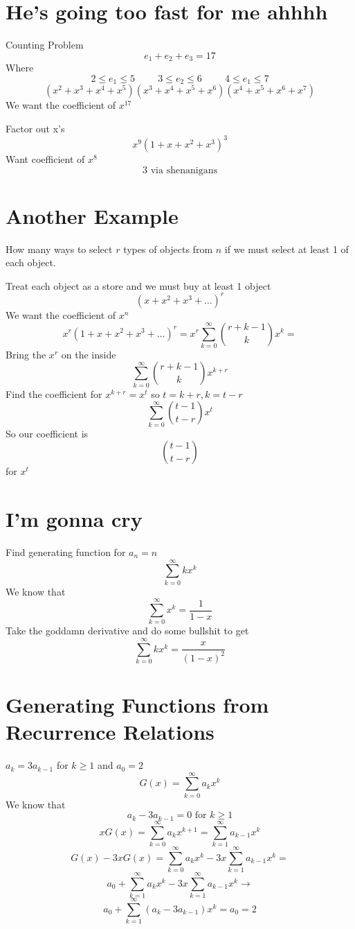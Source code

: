 \documentclass{report}
\begin{document}
\section{He's going too fast for me ahhhh}
Counting Problem
\[
e_1 + e_2 + e_3 = 17
\]
Where
\[
2 \leq e_1 \leq 5
\hspace{1cm}
3 \leq e_2 \leq 6
\hspace{1cm}
4 \leq e_1 \leq 7
\]
\[
(x^2 + x^3 + x^4 + x^5)
(x^3 + x^4 + x^5 + x^6)
(x^4 + x^5 + x^6 + x^7)
\]
We want the coefficient of $x^{17}$

Factor out x's
\[
x^9 (1 + x + x^2 + x^3)^3
\]
Want coefficient of $x^8$
\[
3 \textrm{ via shenanigans}
\]

\section{Another Example}
How many ways to select $r$ types of objects from $n$ if we must select at least 1 of each object.

Treat each object as a store and we must buy at least 1 object
\[
(x+x^2+x^3 + \ldots )^r
\]
We want the coefficient of $x^n$
\[
x^r (1 + x+x^2+x^3 + \ldots )^r
=
x^r \sum^\infty_{k=0} {r+k-1 \choose k} x^k
=
\]
Bring the $x^r$ on the inside
\[
 \sum^\infty_{k=0} {r+k-1 \choose k} x^{k+r}
\]
Find the coefficient for $x^{k+r} = x^t$ so $t = k+r, k = t -r$
\[
 \sum^\infty_{k=0} {t-1 \choose t-r} x^{t}
\]
So our coefficient is 
\[
{t-1 \choose t-r}
\]
for $x^t$


\section{I'm gonna cry}
Find generating function for $a_n = n$
\[
\sum^\infty_{k=0} k x^k
\]
We know that 
\[
\sum^\infty_{k=0} x^k = \frac{1}{1-x}
\]
Take the goddamn derivative and do some bullshit to get
\[
\sum^\infty_{k=0} k x^k = \frac{x}{(1-x)^2}
\]


\section{Generating Functions from Recurrence Relations}
$a_k = 3a_{k-1} $ for $k \geq 1$ and $a_0 = 2$
\[
G(x) 
= 
\sum^\infty_{k=0}a_k x^k
\]
We know that 
\[
a_k - 3a_{k-1} = 0 \textrm{ for } k \geq 1
\]
\[
xG(x) 
= 
\sum^\infty_{k=0}a_k x^{k+1}
=
\sum^\infty_{k=1}a_{k-1} x^{k}
\]
\[
G(x) - 3xG(x) = 
\sum^\infty_{k=0}a_k x^k
-
3x \sum^\infty_{k=1}a_{k-1} x^{k}
=
\]
\[
a_0
+
\sum^\infty_{k=1}a_k x^k
-
3x \sum^\infty_{k=1}a_{k-1} x^{k}
\longrightarrow
\]
\[
a_0 + \sum^\infty_{k=1} (a_k - 3a_{k-1}) x^k
=
a_0 
=
2
\]
\end{document}
